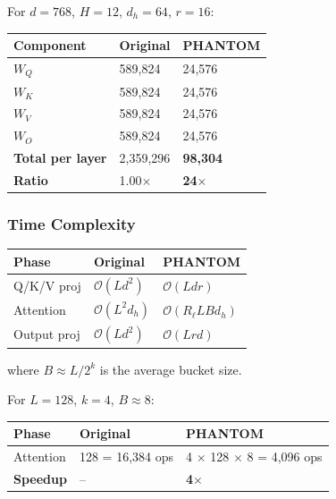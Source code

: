 For $d = 768$, $H = 12$, $d_h = 64$, $r = 16$:

\begin{table}[H]
\centering
\small
\begin{tabular}{lll}
\toprule
\textbf{Component} & \textbf{Original} & \textbf{PHANTOM} \\
\midrule
$W_Q$ & 589,824 & 24,576 \\
$W_K$ & 589,824 & 24,576 \\
$W_V$ & 589,824 & 24,576 \\
$W_O$ & 589,824 & 24,576 \\
\textbf{Total per layer} & 2,359,296 & \textbf{98,304} \\
\textbf{Ratio} & 1.00$\times$ & \textbf{24$\times$} \\
\bottomrule
\end{tabular}
\end{table}

\subsubsection{Time Complexity}

\begin{table}[H]
\centering
\small
\begin{tabular}{lll}
\toprule
\textbf{Phase} & \textbf{Original} & \textbf{PHANTOM} \\
\midrule
Q/K/V proj & $\mathcal{O}(L d^2)$ & $\mathcal{O}(L d r)$ \\
Attention & $\mathcal{O}(L^2 d_h)$ & $\mathcal{O}(R_\ell L B d_h)$ \\
Output proj & $\mathcal{O}(L d^2)$ & $\mathcal{O}(L r d)$ \\
\bottomrule
\end{tabular}
\end{table}

where $B \approx L / 2^k$ is the average bucket size.

For $L = 128$, $k = 4$, $B \approx 8$:

\begin{table}[H]
\centering
\small
\begin{tabular}{lll}
\toprule
\textbf{Phase} & \textbf{Original} & \textbf{PHANTOM} \\
\midrule
Attention & 128  = 16,384 ops & 4 $\times$ 128 $\times$ 8 = 4,096 ops \\
\textbf{Speedup} & -- & \textbf{4$\times$} \\
\bottomrule
\end{tabular}
\end{table}

